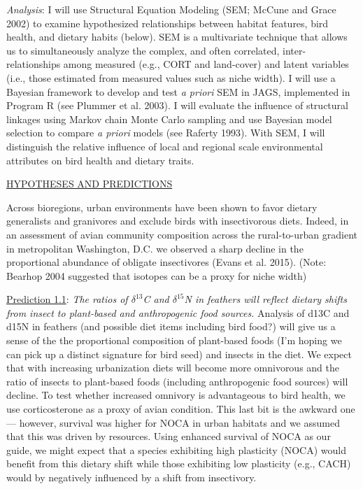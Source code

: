 \documentclass[12pt]{article}
\begin{document}
\noindent \textit{Analysis}: I will use Structural Equation Modeling (SEM; McCune and Grace 2002) to examine hypothesized relationships between habitat features, bird health, and dietary habits (below). SEM is a multivariate technique that allows us to simultaneously analyze the complex, and often correlated, inter-relationships among measured (e.g., CORT and land-cover) and latent variables (i.e., those estimated from measured values such as niche width). I will use a Bayesian framework to develop and test \textit{a priori} SEM in JAGS, implemented in Program R (see Plummer et al. 2003). I will evaluate the influence of structural linkages using Markov chain Monte Carlo sampling and use Bayesian model selection to compare \textit{a priori} models (see Raferty 1993). With SEM, I will distinguish the relative influence of local and regional scale environmental attributes on bird health and dietary traits. 


\noindent \underline{HYPOTHESES AND PREDICTIONS}\par


 Across bioregions, urban environments have been shown to favor dietary generalists and granivores and exclude birds with insectivorous diets. Indeed, in an assessment of avian community composition across the rural-to-urban gradient in metropolitan Washington, D.C. we observed a sharp decline in the proportional abundance of obligate insectivores (Evans et al. 2015). (Note: Bearhop 2004 suggested that isotopes can be a proxy for niche width)\par


\noindent \underline{Prediction 1.1}: \textit{The ratios of $\delta^{13}$C and $\delta^{15}$N in feathers will reflect dietary shifts from insect to plant-based and anthropogenic food sources.}  Analysis of d13C and d15N in feathers (and possible diet items including bird food?) will give us a sense of the the proportional composition of plant-based foods (I’m hoping we can pick up a distinct signature for bird seed) and insects in the diet. We expect that with increasing urbanization diets will become more omnivorous and the ratio of insects to plant-based foods (including anthropogenic food sources) will decline. To test whether increased omnivory is advantageous to bird health, we use corticosterone as a proxy of avian condition. This last bit is the awkward one — however, survival was higher for NOCA in urban habitats and we assumed that this was driven by resources. Using enhanced survival of NOCA as our guide, we might expect that a species exhibiting high plasticity (NOCA) would benefit from this dietary shift while those exhibiting low plasticity (e.g., CACH) would by negatively influenced by a shift from insectivory.\par
\end{document}
